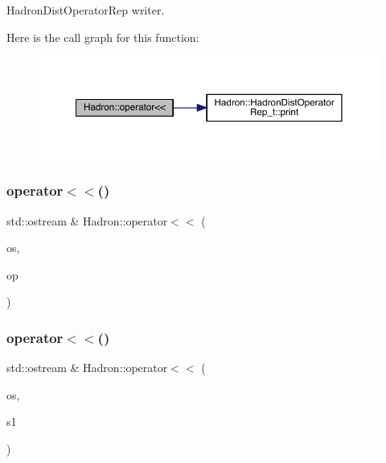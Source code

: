 Hadron\+Dist\+Operator\+Rep writer. 

Here is the call graph for this function\+:
\nopagebreak
\begin{figure}[H]
\begin{center}
\leavevmode
\includegraphics[width=350pt]{d1/daf/namespaceHadron_a4ff4eac2687982e6a251bf3524940b01_cgraph}
\end{center}
\end{figure}
\mbox{\label{namespaceHadron_ac39a55fe17a7ba63e515041398ff55e4}} 
\subsubsection{\texorpdfstring{operator$<$$<$()}{operator<<()}\hspace{0.1cm}{\footnotesize\ttfamily [47/48]}}
{\footnotesize\ttfamily std\+::ostream \& Hadron\+::operator$<$$<$ (\begin{DoxyParamCaption}\item[{std\+::ostream \&}]{os,  }\item[{const \mbox{\hyperlink{structHadron_1_1KeySingleHadronQuarkFlavorColor__t}{Key\+Single\+Hadron\+Quark\+Flavor\+Color\+\_\+t}} \&}]{op }\end{DoxyParamCaption})}

\mbox{\label{namespaceHadron_aa68c7efacb8bc21a4d87aede8544def5}} 
\subsubsection{\texorpdfstring{operator$<$$<$()}{operator<<()}\hspace{0.1cm}{\footnotesize\ttfamily [48/48]}}
{\footnotesize\ttfamily std\+::ostream \& Hadron\+::operator$<$$<$ (\begin{DoxyParamCaption}\item[{std\+::ostream \&}]{os,  }\item[{const \mbox{\hyperlink{namespaceHadron_a03b319764f85c20434f20a269ce5f388}{Map\+Single\+Hadron\+Quark\+Flavor\+Color\+Spin\+\_\+t}} \&}]{s1 }\end{DoxyParamCaption})}

